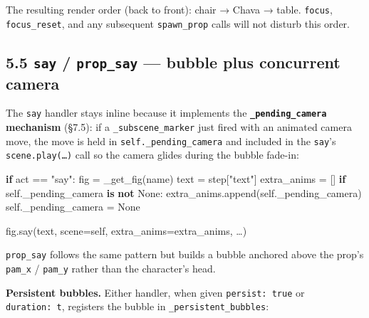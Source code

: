 \documentclass[
  11pt,
]{book}
\newenvironment{Shaded}{}{}
\newcommand{\ControlFlowTok}[1]{\textcolor[rgb]{0.00,0.44,0.13}{\textbf{#1}}}
\newcommand{\KeywordTok}[1]{\textcolor[rgb]{0.00,0.44,0.13}{\textbf{#1}}}
\newcommand{\NormalTok}[1]{#1}
\newcommand{\OperatorTok}[1]{\textcolor[rgb]{0.40,0.40,0.40}{#1}}
\newcommand{\StringTok}[1]{\textcolor[rgb]{0.25,0.44,0.63}{#1}}
\newcommand{\VariableTok}[1]{\textcolor[rgb]{0.10,0.09,0.49}{#1}}
\begin{document}
The resulting render order (back to front): chair → Chava → table.
\texttt{focus}, \texttt{focus\_reset}, and any subsequent
\texttt{spawn\_prop} calls will not disturb this order.

\subsection{\texorpdfstring{5.5 \texttt{say} / \texttt{prop\_say} ---
bubble plus concurrent
camera}{5.5 say / prop\_say --- bubble plus concurrent camera}}\label{say-prop_say-bubble-plus-concurrent-camera}

The \texttt{say} handler stays inline because it implements the
\textbf{\texttt{\_pending\_camera} mechanism} (§7.5): if a
\texttt{\_subscene\_marker} just fired with an animated camera move, the
move is held in \texttt{self.\_pending\_camera} and included in the
\texttt{say}'s \texttt{scene.play(…)} call so the camera glides during
the bubble fade-in:

\begin{Shaded}
\begin{Highlighting}[]
\ControlFlowTok{if}\NormalTok{ act }\OperatorTok{==} \StringTok{"say"}\NormalTok{:}
\NormalTok{    fig }\OperatorTok{=}\NormalTok{ \_get\_fig(name)}
\NormalTok{    text }\OperatorTok{=}\NormalTok{ step[}\StringTok{"text"}\NormalTok{]}
\NormalTok{    extra\_anims }\OperatorTok{=}\NormalTok{ []}
    \ControlFlowTok{if} \VariableTok{self}\NormalTok{.\_pending\_camera }\KeywordTok{is} \KeywordTok{not} \VariableTok{None}\NormalTok{:}
\NormalTok{        extra\_anims.append(}\VariableTok{self}\NormalTok{.\_pending\_camera)}
        \VariableTok{self}\NormalTok{.\_pending\_camera }\OperatorTok{=} \VariableTok{None}

\NormalTok{    fig.say(text, scene}\OperatorTok{=}\VariableTok{self}\NormalTok{,}
\NormalTok{            extra\_anims}\OperatorTok{=}\NormalTok{extra\_anims,}
\NormalTok{            …)}
\end{Highlighting}
\end{Shaded}

\texttt{prop\_say} follows the same pattern but builds a bubble anchored
above the prop's \texttt{pam\_x} / \texttt{pam\_y} rather than the
character's head.

\textbf{Persistent bubbles.} Either handler, when given
\texttt{persist:\ true} or \texttt{duration:\ t}, registers the bubble
in \texttt{\_persistent\_bubbles}:
\end{document}
